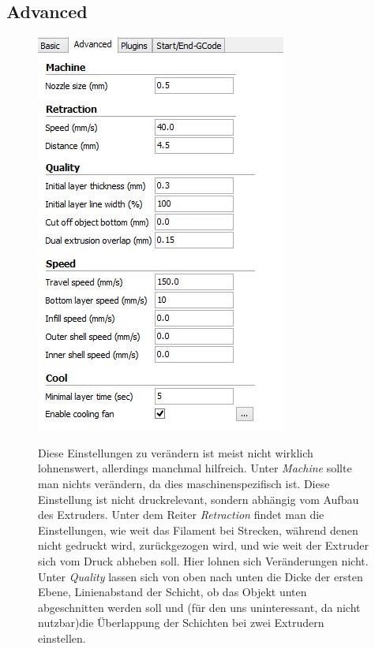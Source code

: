 \documentclass[11pt,a4paper]{scrartcl}
\begin{document}
\subsection*{Advanced}
\begin{figure}[ht]
\begin{minipage}{.55\textwidth}
\begin{center}
 \includegraphics[scale=0.7]{res/CuraSettingAdvanced.JPG}
 \end{center}
\end{minipage}
\begin{minipage}{.47\textwidth}
Diese Einstellungen zu verändern ist meist nicht wirklich lohnenswert, allerdings manchmal hilfreich. Unter \textit{Machine} sollte man nichts verändern, da dies maschinenspezifisch ist. Diese Einstellung ist nicht druckrelevant, sondern abhängig vom Aufbau des Extruders. Unter dem Reiter \textit{Retraction} findet man die Einstellungen, wie weit das Filament bei Strecken, während denen nicht gedruckt wird, zurückgezogen wird, und wie weit der Extruder sich vom Druck abheben soll. Hier lohnen sich Veränderungen nicht.\\
Unter \textit{Quality} lassen sich von oben nach unten die Dicke der ersten Ebene, Linienabstand der Schicht, ob das Objekt unten abgeschnitten werden soll und (für den uns uninteressant, da nicht nutzbar)die Überlappung der Schichten bei zwei Extrudern einstellen.\\
\end{minipage}
\end{figure}
\end{document}
